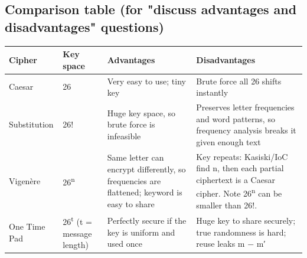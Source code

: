 \documentclass[11pt,a4paper]{article}
\begin{document}
\subsection*{Comparison table (for "discuss advantages and disadvantages" questions)}
\begin{xltabular}{\linewidth}{|l|l|>{\raggedright\arraybackslash}X|>{\raggedright\arraybackslash}X|}\hline
{}\textbf{Cipher} & \textbf{Key space} & \textbf{Advantages} & \textbf{Disadvantages} \\ \hline\endhead
Caesar & 26 & Very easy to use; tiny key & Brute force all 26 shifts instantly \\ \hline
Substitution & 26! & Huge key space, so brute force is infeasible & Preserves letter frequencies and word patterns, so frequency analysis breaks it given enough text \\ \hline
Vigenère & 26\textsuperscript{n} & Same letter can encrypt differently, so frequencies are flattened; keyword is easy to share & Key repeats: Kasiski/IoC find n, then each partial ciphertext is a Caesar cipher. Note 26\textsuperscript{n} can be smaller than 26!. \\ \hline
One Time Pad & 26\textsuperscript{t} (t = message length) & Perfectly secure if the key is uniform and used once & Huge key to share securely; true randomness is hard; reuse leaks m \ensuremath{-} m′ \\ \hline
\end{xltabular}
\end{document}
